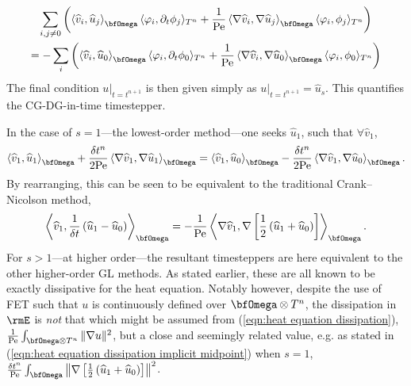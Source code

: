 \begin{example}
\begin{align}
        \end{align}
        \vspace{-8mm}
        \begin{multline}
            \sum_{i, j \neq 0}\left(\left\langle\widehat{v}_{i}, \widehat{u}_{j}\right\rangle_{\bfOmega}\langle\varphi_{i}, \partial_{t}\phi_{j}\rangle_{T^{n}} + \frac{1}{\rmPe}\left\langle\nabla\widehat{v}_{i}, \nabla\widehat{u}_{j}\right\rangle_{\bfOmega}\langle\varphi_{i}, \phi_{j}\rangle_{T^{n}}\right)  \\
            =  - \sum_{i}\left(\left\langle\widehat{v}_{i}, \widehat{u}_{0}\right\rangle_{\bfOmega}\langle\varphi_{i}, \partial_{t}\phi_{0}\rangle_{T^{n}} + \frac{1}{\rmPe}\left\langle\nabla\widehat{v}_{i}, \nabla\widehat{u}_{0}\right\rangle_{\bfOmega}\langle\varphi_{i}, \phi_{0}\rangle_{T^{n}}\right)
        \end{multline}
        The final condition $u|_{t = t^{n + 1}}$ is then given simply as $u|_{t = t^{n + 1}}  =  \widehat{u}_{s}$. This quantifies the CG-DG-in-time timestepper.

        In the case of $s  =  1$---the lowest-order method---one seeks $\widehat{u}_{1}$, such that $\forall \widehat{v}_{1}$,
        \begin{equation}
            \left\langle\widehat{v}_{1}, \widehat{u}_{1}\right\rangle_{\bfOmega} + \frac{\delta t^{n}}{2\rmPe}\left\langle\nabla\widehat{v}_{1}, \nabla\widehat{u}_{1}\right\rangle_{\bfOmega}  =  \left\langle\widehat{v}_{1}, \widehat{u}_{0}\right\rangle_{\bfOmega} - \frac{\delta t^{n}}{2\rmPe}\left\langle\nabla\widehat{v}_{1}, \nabla\widehat{u}_{0}\right\rangle_{\bfOmega}.
        \end{equation}
        By rearranging, this can be seen to be equivalent to the traditional Crank--Nicolson method,
        \begin{equation}
            \left\langle\widehat{v}_{1}, \frac{1}{\delta t}\left(\widehat{u}_{1} - \widehat{u}_{0}\right)\right\rangle_{\bfOmega}  =  - \frac{1}{\rmPe}\left\langle\nabla\widehat{v}_{1}, \nabla\left[\frac{1}{2}\left(\widehat{u}_{1} + \widehat{u}_{0}\right)\right]\right\rangle_{\bfOmega}.
        \end{equation}
        For $s  >  1$---at higher order---the resultant timesteppers are here equivalent to the other higher-order GL methods. As stated earlier, these are all known to be exactly dissipative for the heat equation. Notably however, despite the use of FET such that $u$ is continuously defined over $\bfOmega\otimes T^{n}$, the dissipation in $\rmE$ is \emph{not} that which might be assumed from (\ref{eqn:heat equation dissipation}), $\frac{1}{\rmPe}\int_{\bfOmega\otimes T^{n}}\|\nabla u\|^{2}$, but a close and seemingly related value, e.g. as stated in (\ref{eqn:heat equation dissipation implicit midpoint}) when $s = 1$, $\frac{\delta t^{n}}{\rmPe}\int_{\bfOmega}\left\|\nabla\left[\frac{1}{2}\left(\widehat{u}_{1} + \widehat{u}_{0}\right)\right]\right\|^{2}$.
    \end{example}